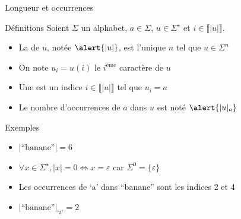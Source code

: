 
\begingroup

\begin{frame}{Longueur et occurrences}
  
  \begin{block}{Définitions}
    Soient $\Sigma$ un alphabet, $a\in\Sigma$, $u\in \Sigma^\star$ et $i\in \llbracket |u|\rrbracket$.
    \begin{itemize}
    \item La  de $u$, notée $\alert{|u|}$, est l'unique $n$ tel que $u\in \Sigma^n$
    \item On note \alert{$u_i = u(i)$} le $i^\text{ème}$ caractère de $u$
    \item Une  est un indice $i\in \llbracket |u|\rrbracket$ tel que $u_i = a$
    \item Le nombre d'occurrences de $a$ dans $u$ est noté $\alert{|u|_a}$
    \end{itemize}
  \end{block}
  
  \begin{exampleblock}{Exemples}
    \begin{itemize}
    \item $|\text{``banane''}| = 6$
    \item $\forall x\in \Sigma^\star, |x| = 0 \Leftrightarrow x = \varepsilon$ car $\Sigma^0 = \{\varepsilon\}$
    \item Les occurrences de `a' dans ``banane'' sont les indices 2 et 4
    \item $|\text{``banane''}|_{\text{`a'}} = 2$
    \end{itemize}
  \end{exampleblock}

\end{frame}

\endgroup
\endinput
